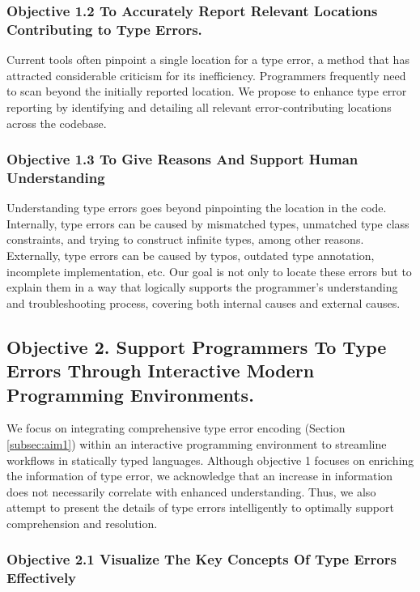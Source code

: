\subsubsection{Objective 1.2 To Accurately Report Relevant Locations Contributing to Type Errors.}
Current tools often pinpoint a single location for a type error, a method that has attracted considerable criticism for its inefficiency. Programmers frequently need to scan beyond the initially reported location. We propose to enhance type error reporting by identifying and detailing all relevant error-contributing locations across the codebase.

\subsubsection{Objective 1.3 To Give Reasons And Support Human Understanding}
Understanding type errors goes beyond pinpointing the location in the code. Internally, type errors can be caused by mismatched types, unmatched type class constraints, and trying to construct infinite types, among other reasons. Externally, type errors can be caused by typos, outdated type annotation, incomplete implementation, etc. Our goal is not only to locate these errors but to explain them in a way that logically supports the programmer's understanding and troubleshooting process, covering both internal causes and external causes.



\subsection{Objective 2. Support Programmers To Type Errors Through Interactive Modern Programming Environments.}

We focus on integrating comprehensive type error encoding (Section \ref{subsec:aim1}) within an interactive programming environment to streamline workflows in statically typed languages. Although objective 1 focuses on enriching the information of type error,  we acknowledge that an increase in information does not necessarily correlate with enhanced understanding. Thus, we also attempt to present the details of type errors intelligently to optimally support comprehension and resolution.

\subsubsection{Objective 2.1 Visualize The Key Concepts Of Type Errors Effectively}

